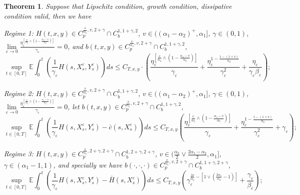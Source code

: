\documentclass[11pt,reqno]{amsart}
\newtheorem{theorem}{\indent Theorem}[section]
\numberwithin{equation}{section}
\begin{document}
\begin{theorem}\label{T63}
	Suppose that  Lipschitz condition, growth condition, dissipative condition valid,   then we have 
	
	Regime 1:  $H(t,x,y)\in C_{p}^{\frac{v}{\alpha_{1}},v,2+\gamma}\cap C_{b}^{1,1+\gamma,2}$, $v\in((\alpha_{1}-\alpha_{2})^{+},\alpha_{1}]$,  $\gamma\in (0,1)$, $ \lim\limits_{\varepsilon \rightarrow0}\frac{ \eta_{\varepsilon}^{\left[ \frac{v}{\alpha_{2}}\wedge \left( 1-\frac{\alpha_{1}-v}{\alpha_{2}} \right)  \right]  }}{\gamma_{\varepsilon}}=0$, and  $b(t,x,y)\in C_{p}^{\frac{v}{\alpha_{1}},v,2+\gamma}\cap C_{b}^{1,1+\gamma,2}$,
	\begin{equation}\label{6.37}
	\sup_{t\in [0,T]}\mathbb{E}\int_{0}^{t}\left(\frac{1}{\gamma_{\varepsilon}} H(s,X_{s}^{\varepsilon},Y_{s}^{\varepsilon}) \right)ds\leq C_{T,x,y}\cdot\left( \frac{ \eta_{\varepsilon}^{\left[ \frac{v}{\alpha_{2}}\wedge \left( 1-\frac{\alpha_{1}-v}{\alpha_{2}} \right)  \right]  }}{\gamma_{\varepsilon}}+\frac{ \eta_{\varepsilon}^{1-\frac{1-(1\wedge v)}{\alpha_{2}}}}{\gamma^{2}_{\varepsilon}}+\frac{\eta_{\varepsilon}}{\gamma_{\varepsilon}\beta_{\varepsilon}}\right);
	\end{equation}
	
	Regime 2:  $H(t,x,y)\in C_{p}^{\frac{v}{\alpha_{1}},v,2+\gamma}\cap C_{b}^{1,1+\gamma,2}$, $v\in((\alpha_{1}-\alpha_{2})^{+},\alpha_{1}]$,  $\gamma\in (0,1)$, $ \lim\limits_{\varepsilon \rightarrow0}\frac{ \eta_{\varepsilon}^{\left[ \frac{v}{\alpha_{2}}\wedge \left( 1-\frac{\alpha_{1}-v}{\alpha_{2}} \right)  \right]  }}{\gamma_{\varepsilon}}=0$, let $b(t,x,y)\in C_{p}^{\frac{v}{\alpha_{1}},v,2+\gamma}\cap C_{b}^{1,1+\gamma,2}$,
	\begin{equation}\label{6.38}
		\sup_{t\in [0,T]}\mathbb{E} \int_{0}^{t}\left(  \frac{1}{\gamma_{\varepsilon}}H(s,X_{s}^{\varepsilon},Y_{s}^{\varepsilon})- \bar{c}(s,X_{s}^{\varepsilon})\right) ds  \leq  C_{T,x,y}\left(\frac{ \eta_{\varepsilon}^{\left[ \frac{v}{\alpha_{2}}\wedge \left( 1-\frac{\alpha_{1}-v}{\alpha_{2}} \right)  \right]  }}{\gamma_{\varepsilon}}+\frac{ \eta_{\varepsilon}^{1-\frac{1-(1\wedge v)}{\alpha_{2}}}}{\gamma^{2}_{\varepsilon}}+\gamma_{\varepsilon}\right) ;
	\end{equation}
	
	Regime 3:  $H(t,x,y)\in C_{p}^{\frac{v}{\alpha_{1}},2+\gamma,2+\gamma}\cap C_{b}^{1,2+\gamma,2+\gamma}$, $v\in ( \frac{\alpha_{2}}{2}\vee \frac{2\alpha_{1}-\alpha_{2}}{2}  ,\alpha_{1}]$, $\gamma\in(\alpha_{1}-1,1)$, and specially we have $b(\cdot,\cdot,\cdot)\in C_{p}^{\frac{v}{\alpha_{1}},v,2+\gamma}\cap C_{b}^{1,1+\gamma,2+\gamma}$,
	\begin{equation}\label{6.39}
\sup_{t\in [0,T]}	\mathbb{E} \int_{0}^{t}\left(  \frac{1}{\gamma_{\varepsilon}}H(s,X_{s}^{\varepsilon},Y_{s}^{\varepsilon})- \bar{H}(s,X_{s}^{\varepsilon})\right) ds  \leq  C_{T,x,y}\left( \gamma_{\varepsilon}^{\frac{2v}{\alpha_{2}}-\left[ 1\vee \left( \frac{2\alpha_{1}}{\alpha_{2}}-1\right)   \right] }+\frac{\gamma_{\varepsilon}}{\beta_{\varepsilon}}\right) ;
	\end{equation}
	

\end{theorem}
\end{document}
